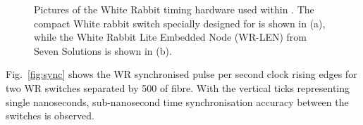\begin{figure} %
    \centering
    \quad
    \caption[Pictures of the White Rabbit timing hardware used within \chipsfive.]
    {Pictures of the White Rabbit timing hardware used within \chipsfive. The compact White rabbit
        switch  specially designed for \chips is shown in (a), while the White Rabbit Lite
        Embedded Node (WR-LEN) from Seven Solutions is shown in (b).}
    \label{fig:wr_electronics}
\end{figure}

Fig.~\ref{fig:sync} shows the WR synchronised pulse per second clock rising edges for two
\chipsfive WR switches separated by \unit{500}{} of fibre. With the vertical ticks
representing single nanoseconds, sub-nanosecond time synchronisation accuracy between the switches
is observed.

